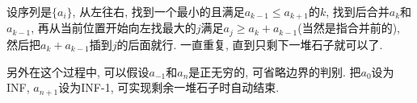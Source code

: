 设序列是$\{a_i\}$, 从左往右, 找到一个最小的且满足$a_{k-1} \le a_{k+1}$的$k$, 找到后合并$a_k$和$a_{k-1}$, 再从当前位置开始向左找最大的$j$满足$a_j \ge a_k + a_{k-1}$(当然是指合并前的), 然后把$a_k + a_{k-1}$插到$j$的后面就行. 一直重复, 直到只剩下一堆石子就可以了.

另外在这个过程中, 可以假设$a_{-1}$和$a_n$是正无穷的, 可省略边界的判别. 把$a_0$设为INF, $a_{n+1}$设为INF-1, 可实现剩余一堆石子时自动结束.